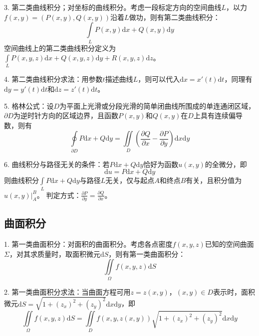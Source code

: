 3. 第二类曲线积分；对坐标的曲线积分。考虑一段标定方向的空间曲线$L$，以力$f(x,y)=\left(P(x,y),Q(x,y)\right)$沿着$L$做功，则有第二类曲线积分：
\begin{equation*}
    \int\limits_L P(x,y)\mathrm{d}x+Q(x,y)\mathrm{d}y
\end{equation*}
空间曲线上的第二类曲线积分定义为$\int\limits_L P(x,y,z)\mathrm{d}x+Q(x,y,z)\mathrm{d}y+R(x,y,z)\mathrm{d}z$。

4. 第二类曲线积分求法：用参数$t$描述曲线$L$，则可以代入$\mathrm{d}x=x'(t)\mathrm{d}t$，同理有$\mathrm{d}y=y'(t)\mathrm{d}t$和$\mathrm{d}z=z'(t)\mathrm{d}t$。

5. 格林公式：设$D$为平面上光滑或分段光滑的简单闭曲线所围成的单连通闭区域，$\partial D$为逆时针方向的区域边界，且函数$P(x,y)$和$Q(x,y)$在$D$上具有连续偏导数，则有
\begin{equation*}
    \oint\limits_{\partial D}P\mathrm{d}x+Q\mathrm{d}y=\iint\limits_{D}\left(\frac{\partial Q}{\partial x}-\frac{\partial P}{\partial y}\right)\mathrm{d}x\mathrm{d}y
\end{equation*}

6. 曲线积分与路径无关的条件：若$P \mathrm{d}x +Q\mathrm{d}y$恰好为函数$u(x,y)$的全微分，即
\begin{equation*}
    \mathrm{d}u=P\mathrm{d}x+Q\mathrm{d}y
\end{equation*}
则曲线积分$\int\limits_{L}P\mathrm{d}x+Q\mathrm{d}y$与路径$L$无关，仅与起点$A$和终点$B$有关，且积分值为$u(x,y)\big|_A^B$。
判定方式：$\frac{\partial P}{\partial y}=\frac{\partial Q}{\partial x}$。

\subsection{曲面积分}

1. 第一类曲面积分：对面积的曲面积分。考虑各点密度$f(x,y,z)$已知的空间曲面$\Sigma$，对其求质量时，取面积微元$\mathrm{d}S$，则有第一类曲面积分：
\begin{equation*}
    \iint\limits_{\Omega}f(x,y,z)\mathrm{d}S
\end{equation*}

2. 第一类曲面积分求法：当曲面方程可用$z=z(x,y)$，$(x,y)\in D$表示时，面积微元$\mathrm{d}S =\sqrt{1+(z_x)^2+(z_y)^2}\mathrm{d}x\mathrm{d}y$，即
\begin{equation*}
    \iint\limits_{\Omega}f(x,y,z)\mathrm{d}S=\iint\limits_D f\left(x,y,z(x,y)\right)\sqrt{1+(z_x)^2+(z_y)^2}\mathrm{d}x\mathrm{d}y
\end{equation*}


